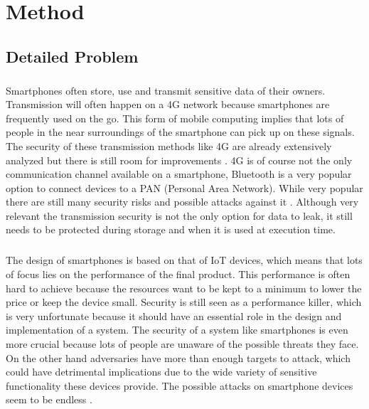 \documentclass{report}
\begin{document}
\chapter{Method}

\section{Detailed Problem}

\paragraph*{}
Smartphones often store, use and transmit sensitive data of their owners. Transmission will often happen on a 4G network because smartphones are frequently used on the go. This form of mobile computing implies that lots of people in the near surroundings of the smartphone can pick up on these signals. The security of these transmission methods like 4G are already extensively analyzed \cite{FerragMohamedAmine2018Sf4a} \cite{ZakiRanaM20214NSA} \cite{JasimKhalidFadhil2022AoEA} but there is still room for improvements \cite{FangKaiming2020Psaa} \cite{LuYu-Han2020Gcfo}. 4G is of course not the only communication channel available on a smartphone, Bluetooth is a very popular option to connect devices to a PAN (Personal Area Network). While very popular there are still many security risks and possible attacks against it \cite{ClaverieTristan2021BRoB} \cite{CayreRomain2021CaWa} \cite{PatelNishitkumar2021IBVt} \cite{AntonioliDaniele2020KNDA}. Although very relevant the transmission security is not the only option for data to leak, it still needs to be protected during storage and when it is used at execution time.

\paragraph*{}
The design of smartphones is based on that of IoT devices, which means that lots of focus lies on the performance of the final product. This performance is often hard to achieve because the resources want to be kept to a minimum to lower the price or keep the device small. Security is still seen as a performance killer, which is very unfortunate because it should have an essential role in the design and implementation of a system. The security of a system like smartphones is even more crucial because lots of people are unaware of the possible threats they face. On the other hand adversaries have more than enough targets to attack, which could have detrimental implications due to the wide variety of sensitive functionality these devices provide. The possible attacks on smartphone devices seem to be endless \cite{PotharajuRahul2012PSAA} \cite{JavedAbdulRehman2020Adms} \cite{SetyawanRico2020Abro} \cite{SongWenna2020ADAv} \cite{ZhuYe2021TSOS} \cite{GRAVELLIERJoseph2021RHAo} \cite{KumarSudesh2020AoAS}. 
\end{document}
